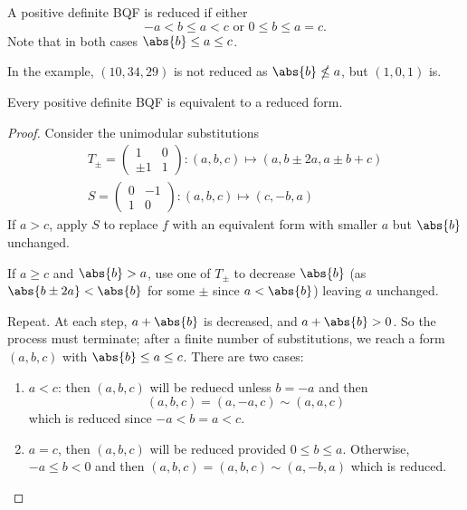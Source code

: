 \documentclass{article}
\begin{document}
\begin{defi}
    A positive definite BQF is reduced if either
    \begin{equation*}
        -a < b \leq a < c \text{ or } 0 \leq b \leq a = c.
    \end{equation*}
    Note that in both cases $\abs{b} \leq a \leq c$.

    In the example, $(10, 34, 29)$ is not reduced as $\abs{b} \nleq a$, but $(1, 0, 1)$ is.
\end{defi}

\begin{nlemma}\label{lem:4.5}
    Every positive definite BQF is equivalent to a reduced form.
\end{nlemma}

\begin{proof}Consider the unimodular substitutions
    \begin{align*}
        T_\pm =
        \begin{pmatrix} 1 & 0 \\ \pm 1 & 1 \end{pmatrix} : (a, b, c) \mapsto (a, b \pm 2a, a \pm b + c) \\
        S =
        \begin{pmatrix} 0 & -1 \\ 1 & 0 \end{pmatrix} : (a, b, c) \mapsto (c, -b, a)
    \end{align*}
    If $a > c$, apply $S$ to replace $f$ with an equivalent form with smaller $a$ but $\abs{b}$ unchanged.

    If $a \geq c$ and $\abs{b} > a$, use one of $T_\pm$ to decrease $\abs{b}$ (as $\abs{b \pm 2a} < \abs{b}$ for some $\pm$ since $a < \abs{b}$) leaving $a$ unchanged.

    Repeat. At each step, $a + \abs{b}$ is decreased, and $a + \abs{b} > 0$.
    So the process must terminate; after a finite number of substitutions, we reach a form $(a, b, c)$ with $\abs{b} \leq a \leq c$.
    There are two cases:
    \begin{enumerate}[label=\alph*)]
        \item $a < c$: then $(a, b, c)$ will be reduecd unless $b = -a$ and then
            \begin{equation*}
                (a, b, c) = (a, -a, c) \sim (a, a, c)
            \end{equation*}
            which is reduced since $-a < b = a < c$.
        \item $a = c$, then $(a, b, c)$ will be reduced provided $0 \leq b \leq a$. Otherwise, $-a \leq b < 0$ and then $(a, b, c) = (a, b, c) \sim (a, -b, a)$ which is reduced. \qedhere
    \end{enumerate}
\end{proof}
\end{document}
